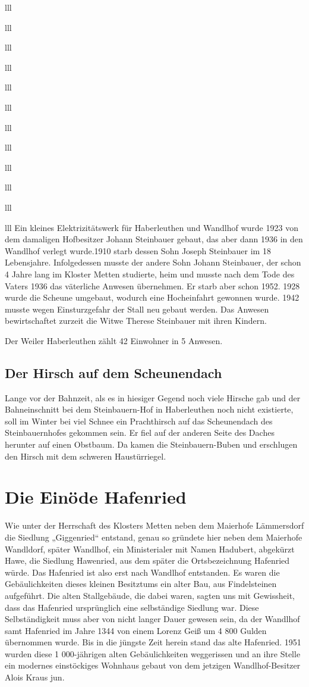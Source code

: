 \documentclass[12pt,a4pager]{book}
\begin{document}
\begin{tabuluar}{lll}
\begin{tabuluar}{lll}
\begin{tabuluar}{lll}
\begin{tabuluar}{lll}
\begin{tabuluar}{lll}
\begin{tabuluar}{lll}
\begin{tabuluar}{lll}
\begin{tabuluar}{lll}
\begin{tabuluar}{lll}
\begin{tabuluar}{lll}
\begin{tabuluar}{lll}
\begin{tabuluar}{lll}
Ein kleines Elektrizitätswerk für Haberleuthen und Wandlhof wurde 1923 von dem
damaligen Hofbesitzer Johann Steinbauer gebaut, das aber dann 1936 in den
Wandlhof verlegt wurde.1910 starb dessen Sohn Joseph Steinbauer im 18
Lebensjahre. Infolgedessen musste der andere Sohn Johann Steinbauer, der schon 4
Jahre lang im Kloster Metten studierte, heim und musste nach dem Tode des Vaters
1936 das väterliche Anwesen übernehmen. Er starb aber schon 1952. 1928 wurde die
Scheune umgebaut, wodurch eine Hocheinfahrt gewonnen wurde. 1942 musste wegen
Einsturzgefahr der Stall neu gebaut werden. Das Anwesen bewirtschaftet zurzeit
die Witwe Therese Steinbauer mit ihren Kindern.

Der Weiler Haberleuthen zählt 42 Einwohner in 5 Anwesen.

\subsection{Der Hirsch auf dem Scheunendach}

Lange vor der Bahnzeit, als es in hiesiger Gegend noch viele Hirsche gab und der
Bahneinschnitt bei dem Steinbauern-Hof in Haberleuthen noch nicht existierte,
soll im Winter bei viel Schnee ein Prachthirsch auf das Scheunendach des
Steinbauernhofes gekommen sein. Er fiel auf der anderen Seite des Daches
herunter auf einen Obstbaum. Da kamen die Steinbauern-Buben und erschlugen den
Hirsch mit dem schweren Haustürriegel.

\section{Die Einöde Hafenried}

Wie unter der Herrschaft des Klosters Metten neben dem Maierhofe Lämmersdorf die
Siedlung „Giggenried“ entstand, genau so gründete hier neben dem Maierhofe
Wandldorf, später Wandlhof, ein Ministerialer mit Namen Hadubert, abgekürzt
Hawe, die Siedlung Hawenried, aus dem später die Ortsbezeichnung Hafenried
würde. Das Hafenried ist also erst nach Wandlhof entstanden. Es waren die
Gebäulichkeiten dieses kleinen Besitztums ein alter Bau, aus Findelsteinen
aufgeführt. Die alten Stallgebäude, die dabei waren, sagten uns mit Gewissheit,
dass das Hafenried ursprünglich eine selbständige Siedlung war. Diese
Selbständigkeit muss aber von nicht langer Dauer gewesen sein, da der Wandlhof
samt Hafenried im Jahre 1344 von einem Lorenz Geiß um 4 800 Gulden übernommen
wurde. Bis in die jüngste Zeit herein stand das alte Hafenried. 1951 wurden
diese 1 000-jährigen alten Gebäulichkeiten weggerissen und an ihre Stelle ein
modernes einstöckiges Wohnhaus gebaut von dem jetzigen Wandlhof-Besitzer Alois
Kraus jun.


\end{tabuluar}
\end{tabuluar}
\end{tabuluar}
\end{tabuluar}
\end{tabuluar}
\end{tabuluar}
\end{tabuluar}
\end{tabuluar}
\end{tabuluar}
\end{tabuluar}
\end{tabuluar}
\end{tabuluar}
\end{document}
